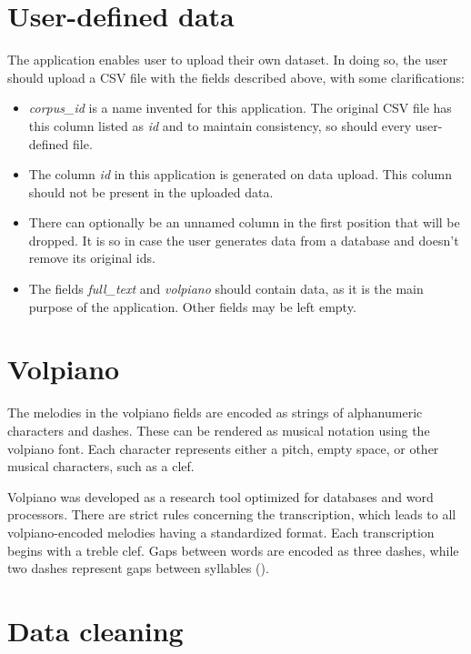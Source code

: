 \section{User-defined data}

The application enables user to upload their own dataset. In doing so, the user should upload a CSV file with the fields described above, with
some clarifications:

\begin{itemize}
    \item \emph{corpus\_id} is a name invented for this application. The original CSV file has this column listed as \emph{id} and
        to maintain consistency, so should every user-defined file.
    \item The column \emph{id} in this application is generated on data upload. This column should not be present in the uploaded
        data.
    \item There can optionally be an unnamed column in the first position that will be dropped. It is so in case the user generates
        data from a database and doesn't remove its original ids.
    \item The fields \emph{full\_text} and \emph{volpiano} should contain data, as it is the main purpose of the application. Other
        fields may be left empty.
\end{itemize}

\section{Volpiano}

The melodies in the volpiano fields are encoded as strings of alphanumeric characters and dashes. These can be rendered as musical notation using
the volpiano font. Each character represents either a pitch, empty space, or other musical characters, such as a clef.

Volpiano was developed as a research tool optimized for databases and word processors. There are strict rules concerning the transcription, which leads
to all volpiano-encoded melodies having a standardized format. Each transcription begins with a treble clef. Gaps between words are encoded as three
dashes, while two dashes represent gaps between syllables (\cite{volpiano}).

\section{Data cleaning}

